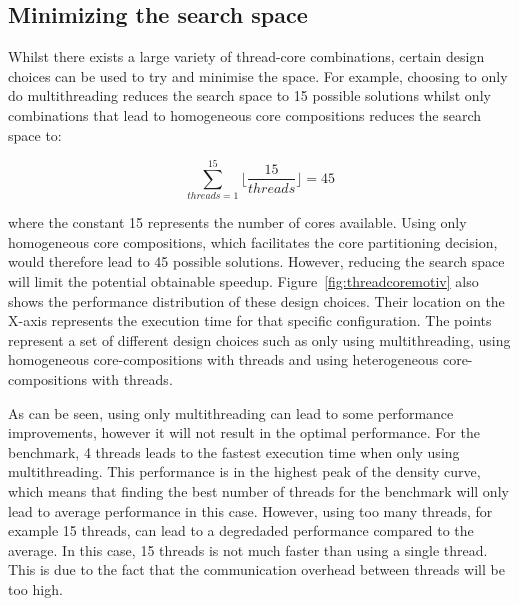 \subsection{Minimizing the search space}
Whilst there exists a large variety of thread-core combinations, certain design choices can be used to try and minimise the space.
For example, choosing to only do multithreading reduces the search space to 15 possible solutions whilst only combinations that lead to homogeneous core compositions reduces the search space to:

\begin{equation}
\sum_{threads=1}^{15} \lfloor\frac{15}{threads}\rfloor= 45
\end{equation}

where the constant 15 represents the number of cores available.
Using only homogeneous core compositions, which facilitates the core partitioning decision, would therefore lead to 45 possible solutions.
However, reducing the search space will limit the potential obtainable speedup.
Figure~\ref{fig:threadcoremotiv} also shows the performance distribution of these design choices.
Their location on the X-axis represents the execution time for that specific configuration.
The points represent a set of different design choices such as only using multithreading, using homogeneous core-compositions with threads and using heterogeneous core-compositions with threads.

As can be seen, using only multithreading can lead to some performance improvements, however it will not result in the optimal performance.
For the  benchmark, 4 threads leads to the fastest execution time when only using multithreading.
This performance is in the highest peak of the density curve, which means that finding the best number of threads for the benchmark will only lead to average performance in this case.
However, using too many threads, for example 15 threads, can lead to a degredaded performance compared to the average.
In this case, 15 threads is not much faster than using a single thread.
This is due to the fact that the communication overhead between threads will be too high.

